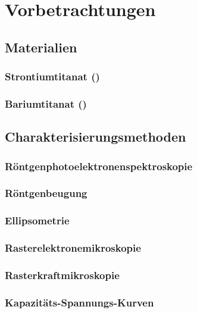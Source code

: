 \chapter{Vorbetrachtungen}

\section{Materialien}
    \subsection[Strontiumtitanat]{Strontiumtitanat ()}
    \subsection[Bariumtitanat]{Bariumtitanat ()}

\section{Charakterisierungsmethoden}
    \subsection{Röntgenphotoelektronenspektroskopie}
    \subsection{Röntgenbeugung}
    \subsection{Ellipsometrie}
    \subsection{Rasterelektronemikroskopie}
    \subsection{Rasterkraftmikroskopie}
    \subsection{Kapazitäts-Spannungs-Kurven}
